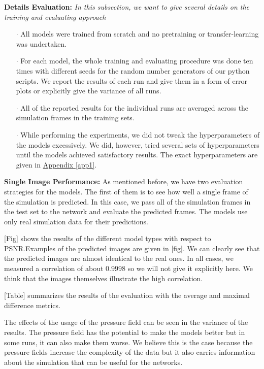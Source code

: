 \documentclass{llncs}
\newcommand{\refapp}[1]{\hyperref[#1]{Appendix \ref*{#1}}}
\begin{document}
\noindent\textbf{Details Evaluation:}
\emph{In this subsection, we want to give several details on the training and evaluating approach}
\begin{itemize}
\item[$\cdot$] All models were trained from scratch and no pretraining or transfer-learning was undertaken.
\item[$\cdot$] For each model, the whole training and evaluating procedure was done ten times with different seeds for the random number generators of our python scripts. We report the results of each run and give them in a form of error plots or explicitly give the variance of all runs.
\item[$\cdot$] All of the reported results for the individual runs are averaged across the simulation frames in the training sets.
\item[$\cdot$] While performing the experiments, we did not tweak the hyperparameters of the models excessively. We did, however, tried several sets of hyperparameters until the models achieved satisfactory results. The exact hyperparameters are given in \refapp{app1}.
\end{itemize}

\noindent\textbf{Single Image Performance:}
As mentioned before, we have two evaluation strategies for the models. The first of them is to see how well a single frame of the simulation is predicted. In this case, we pass all of the simulation frames in the test set to the network and evaluate the predicted frames. The models use only real simulation data for their predictions.

[Fig] shows the results of the different model types with respect to PSNR.\@ Examples of the predicted images are given in [fig]. We can clearly see that the predicted images are almost identical to the real ones. In all cases, we measured a correlation of about $0.9998$ so we will not give it explicitly here. We think that the images themselves illustrate the high correlation.

[Table] summarizes the results of the evaluation with the average and maximal difference metrics.

The effects of the usage of the pressure field can be seen in the variance of the results. The pressure field has the potential to make the models better but in some runs, it can also make them worse. We believe this is the case because the pressure fields increase the complexity of the data but it also carries information about the simulation that can be useful for the networks.
\end{document}
